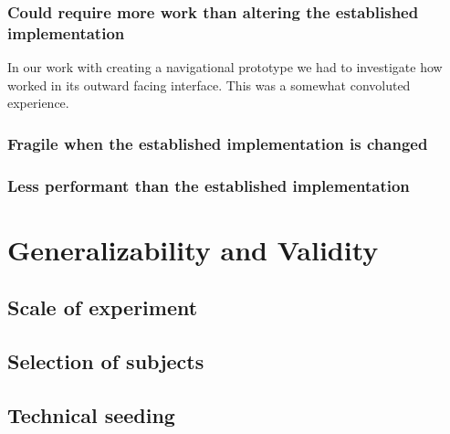 \subsubsection{Could require more work than altering the established
  implementation}

In our work with creating a navigational prototype we had to investigate how
\urort{} worked in its outward facing interface. This was a somewhat
convoluted experience.

\subsubsection{Fragile when the established implementation is changed}

\subsubsection{Less performant than the established implementation}

\section{Generalizability and Validity}

\subsection{Scale of experiment}


\subsection{Selection of subjects}


\subsection{Technical seeding}

